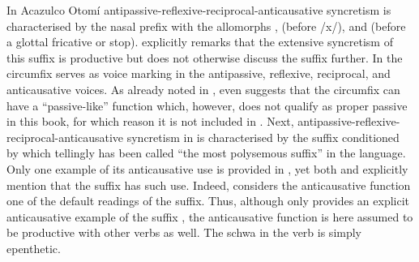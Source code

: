 In Acazulco Otomí antipassive-reflexive-reciprocal-anticausative syncretism is characterised by the nasal prefix  with the allomorphs ,  (before /x/), and  (before a glottal fricative or stop). \cite[512, 525]{hernandez-green:2015} explicitly remarks that the extensive syncretism of this suffix is productive but does not otherwise discuss the suffix further. In  the circumfix  serves as voice marking in the antipassive, reflexive, reciprocal, and anticausative voices. As already noted in , \cite[519]{vuillermet:2012} even suggests that the circumfix can have a “passive-like” function which, however, does not qualify as proper passive in this book, for which reason it is not included in . Next, antipassive-reflexive-reciprocal-anticausative syncretism in  is characterised by the suffix  conditioned by  which \cite[221]{nedjalkov:2006} tellingly has been called “the most polysemous suffix” in the language. Only one example of its anticausative use is provided in , yet both \cite[186]{kurebito:2012} and \cite[222]{nedjalkov:2006} explicitly mention that the suffix has such use. Indeed, \cite[222]{nedjalkov:2006} considers the anticausative function one of the default readings of the suffix. Thus, although only \citeauthor{nedjalkov:2006} provides an explicit anticausative example of the suffix , the anticausative function is here assumed to be productive with other verbs as well. The schwa in the verb  is simply epenthetic.

